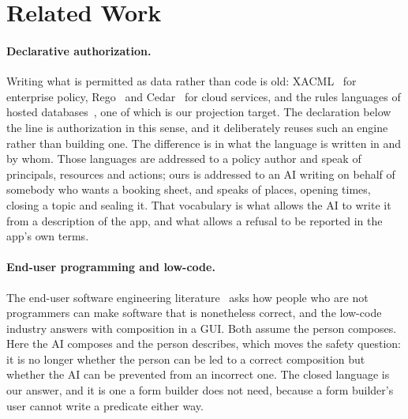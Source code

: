 \documentclass[11pt]{article}
\begin{document}
\section{Related Work}
\label{sec:related}

\paragraph{Declarative authorization.} Writing what is permitted as data rather than code is old: XACML~\cite{oasis2013xacml} for enterprise policy, Rego~\cite{opa2026rego} and Cedar~\cite{cutler2024cedar} for cloud services, and the rules languages of hosted databases~\cite{firebase2026rules}, one of which is our projection target. The declaration below the line is authorization in this sense, and it deliberately reuses such an engine rather than building one. The difference is in what the language is written in and by whom. Those languages are addressed to a policy author and speak of principals, resources and actions; ours is addressed to an AI writing on behalf of somebody who wants a booking sheet, and speaks of places, opening times, closing a topic and sealing it. That vocabulary is what allows the AI to write it from a description of the app, and what allows a refusal to be reported in the app's own terms.

\paragraph{End-user programming and low-code.} The end-user software engineering literature~\cite{nardi1993small,ko2011enduser} asks how people who are not programmers can make software that is nonetheless correct, and the low-code industry answers with composition in a GUI. Both assume the person composes. Here the AI composes and the person describes, which moves the safety question: it is no longer whether the person can be led to a correct composition but whether the AI can be prevented from an incorrect one. The closed language is our answer, and it is one a form builder does not need, because a form builder's user cannot write a predicate either way.
\end{document}
